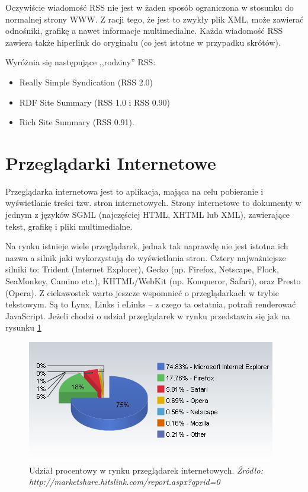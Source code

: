 \documentclass[a4paper,12pt,oneside]{report}
\begin{document}
Oczywiście wiadomość RSS nie jest w żaden sposób ograniczona w stosunku do normalnej strony WWW. Z racji tego, że jest to zwykły plik XML, może zawierać odnośniki, grafikę a nawet informacje multimedialne. Każda wiadomość RSS zawiera także hiperlink do oryginału (co jest istotne w przypadku skrótów). 

Wyróżnia się następujące ,,rodziny'' RSS:
\begin{itemize}
  \item Really Simple Syndication (RSS 2.0)
  \item RDF Site Summary (RSS 1.0 i RSS 0.90)
  \item Rich Site Summary (RSS 0.91).
\end{itemize}
\section{Przeglądarki Internetowe}
\label{sec:przegladarki}

Przeglądarka internetowa jest to aplikacja, mająca na celu pobieranie i wyświetlanie treści tzw. stron internetowych. Strony internetowe to dokumenty w jednym z języków SGML (najczęściej HTML, XHTML lub XML), zawierające tekst, grafikę i pliki multimedialne.

Na rynku istnieje wiele przeglądarek, jednak tak naprawdę nie jest istotna ich nazwa a silnik jaki wykorzystują do wyświetlania stron. Cztery najważniejsze silniki to: Trident (Internet Explorer), Gecko (np. Firefox, Netscape, Flock, SeaMonkey, Camino etc.), KHTML/WebKit (np. Konqueror, Safari), oraz Presto (Opera). Z ciekawostek warto jeszcze wspomnieć o przeglądarkach w trybie tekstowym. Są to Lynx, Links i eLinks -- z czego ta ostatnia, potrafi renderować JavaScript. Jeżeli chodzi o udział przeglądarek w rynku przedstawia się jak na rysunku \ref{fig:przegladarki}
\begin{figure}[h]
\centering
  \includegraphics{browsers.png}
  \caption{
  Udział procentowy w rynku przeglądarek internetowych.\newline
  \emph{Źródło: http://marketshare.hitslink.com/report.aspx?qprid=0}
  \label{fig:przegladarki}
  }
\end{figure}
\end{document}
